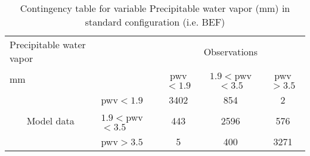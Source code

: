 
\begin{table}[]
\begin{center}
\begin{tabular}{llccc}
\hline
{Precipitable water vapor}                                       &                                                    & \multicolumn{3}{c}{Observations}                 \\
{mm}                                       &                             & pwv$<1.9$   & $1.9<$pwv$<3.5$ & pwv$>3.5$ \\
\hline
\multicolumn{1}{c}{\multirow{3}{*}{Model data}}  & pwv$<1.9$          & 3402                & 854                       & 2              \\
                                                 & $1.9<$pwv$<3.5$ & 443                & 2596                       & 576              \\
                                                 & pwv$>3.5$          & 5                & 400                       & 3271              \\
\hline
\end{tabular}
\end{center}
\caption{Contingency table for variable Precipitable water vapor (mm) in standard configuration (i.e. BEF)}
\label{tab:contingency}
\end{table}
